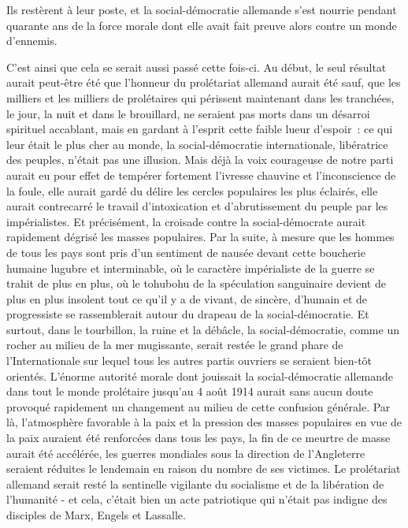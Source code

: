 \documentclass[french,twoside]{book} %
\begin{document}
\noindent Ils restèrent à leur poste, et la social-démocratie allemande s’est nourrie pendant quarante ans de la force morale dont elle avait fait preuve alors contre un monde d’ennemis.\par
C'est ainsi que cela se serait aussi passé cette fois-ci. Au début, le seul résultat aurait peut-être été que l’honneur du prolétariat allemand aurait été sauf, que les milliers et les milliers de prolétaires qui périssent maintenant dans les tranchées, le jour, la nuit et dans le brouillard, ne seraient pas morts dans un désarroi spirituel accablant, mais en gardant à l’esprit cette faible lueur d’espoir : ce qui leur était le plus cher au monde, la social-démocratie internationale, libératrice des peuples, n’était pas une illusion. Mais déjà la voix courageuse de notre parti aurait eu pour effet de tempérer fortement l’ivresse chauvine et l’inconscience de la foule, elle aurait gardé du délire les cercles populaires les plus éclairés, elle aurait contrecarré le travail d’intoxication et d’abrutissement du peuple par les impérialistes. Et précisément, la croisade contre la social-démocrate aurait rapidement dégrisé les masses populaires. Par la suite, à mesure que les hommes de tous les pays sont pris d’un sentiment de nausée devant cette boucherie humaine lugubre et interminable, où le caractère impérialiste de la guerre se trahit de plus en plus, où le tohubohu de la spéculation sanguinaire devient de plus en plus insolent tout ce qu’il y a de vivant, de sincère, d’humain et de progressiste se rassemblerait autour du drapeau de la social-démocratie. Et surtout, dans le tourbillon, la ruine et la débâcle, la social-démocratie, comme un rocher au milieu de la mer mugissante, serait restée le grand phare de l’Internationale sur lequel tous les autres partis ouvriers se seraient bien-tôt orientés. L'énorme autorité morale dont jouissait la social-démocratie allemande dans tout le monde prolétaire jusqu’au 4 août 1914 aurait sans aucun doute provoqué rapidement un changement au milieu de cette confusion générale. Par là, l’atmosphère favorable à la paix et la pression des masses populaires en vue de la paix auraient été renforcées dans tous les pays, la fin de ce meurtre de masse aurait été accélérée, les guerres mondiales sous la direction de l’Angleterre seraient réduites le lendemain en raison du nombre de ses victimes. Le prolétariat allemand serait resté la sentinelle vigilante du socialisme et de la libération de l’humanité - et cela, c’était bien un acte patriotique qui n’était pas indigne des disciples de Marx, Engels et Lassalle.
\end{document}

